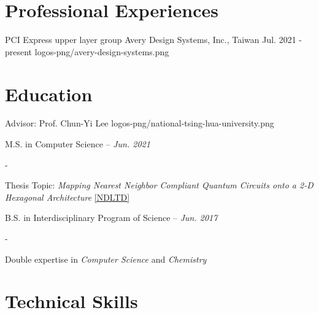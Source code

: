 \documentclass{cvclass}
\begin{document}
\makeinfo


\section{Professional Experiences}

    {PCI Express upper layer group}
    {Avery Design Systems, Inc., Taiwan}
    {Jul. 2021 - present}
    {logos-png/avery-design-systems.png}


\section{Education}

        {Advisor: Prof. Chun-Yi Lee}
        {logos-png/national-tsing-hua-university.png}{
    \item M.S. in Computer Science -- \textit{Jun. 2021}
    \begin{plainitemize}{-}
        \item Thesis Topic: \textit{Mapping Nearest Neighbor Compliant Quantum Circuits onto a 2-D Hexagonal Architecture} \href{https://hdl.handle.net/11296/dpttkc}{[NDLTD]}
    \end{plainitemize}
    \item B.S. in Interdisciplinary Program of Science -- \textit{Jun. 2017}
    \begin{plainitemize}{-}
        \item Double expertise in \textit{Computer Science} and \textit{Chemistry}
    \end{plainitemize}}


\makepublications


\section{Technical Skills}
\end{document}
